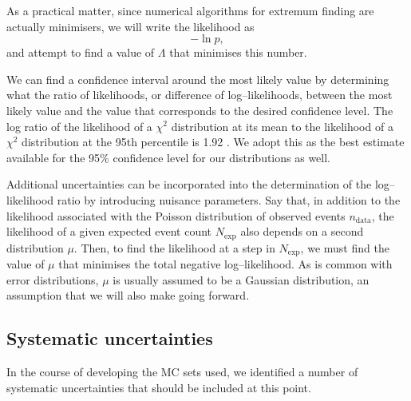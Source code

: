 As a practical matter, since numerical algorithms for extremum finding are actually minimisers, we will write the likelihood as 
\[-\ln p,\]
and attempt to find a value of $\Lambda$ that minimises this number. 

We can find a confidence interval around the most likely value by determining what the ratio of likelihoods, or difference of log--likelihoods, between the most likely value and the value that corresponds to the desired confidence level. The log ratio of the likelihood of a $\chi^2$ distribution at its mean to the likelihood of a $\chi^2$ distribution at the 95th percentile is 1.92 \cite{pdg}. We adopt this as the best estimate available for the 95\% confidence level for our distributions as well.

Additional uncertainties can be incorporated into the determination of the log--likelihood ratio by introducing nuisance parameters. Say that, in addition to the likelihood associated with the Poisson distribution of observed events $n_\text{data}$, the likelihood of a given expected event count $N_\text{exp}$ also depends on a second distribution $\mu$. Then, to find the likelihood at a step in $N_\text{exp}$, we must find the value of $\mu$ that minimises the total negative log--likelihood. As is common with error distributions, $\mu$ is usually assumed to be a Gaussian distribution, an assumption that we will also make going forward.

\subsection{Systematic uncertainties}
In the course of developing the MC sets used, we identified a number of systematic uncertainties that should be included at this point.

